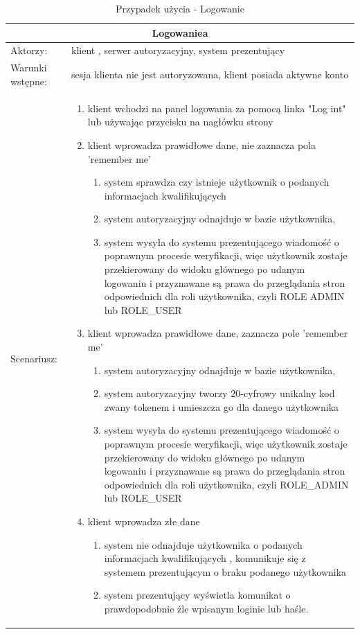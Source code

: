 \begin{table}[h!]
\begin{tabular}{ |p{2cm}||p{13cm}|  }
	
	\hline
	\multicolumn{2}{|c|}{Logowaniea} \\
	\hline
Aktorzy: &klient , serwer autoryzacyjny, system prezentujący\\
	\hline
Warunki wstępne: & sesja klienta nie jest autoryzowana, klient posiada aktywne konto\\
	\hline
	Scenariusz: &
	\begin{enumerate}
		\item klient wchodzi na panel logowania za pomocą linka "Log int" lub używając przycisku na nagłówku strony 
		\item klient wprowadza prawidłowe dane, nie zaznacza pola 'remember me'
		\begin{enumerate}
			\item system sprawdza czy istnieje użytkownik o podanych informacjach kwalifikujących
			\item system autoryzacyjny odnajduje w bazie użytkownika,
			\item system wysyła do systemu prezentującego wiadomość o poprawnym procesie weryfikacji, więc użytkownik zostaje przekierowany do widoku głównego po udanym logowaniu i przyznawane są prawa do przeglądania stron odpowiednich dla roli użytkownika, czyli ROLE ADMIN lub ROLE\_USER
		\end{enumerate}
		\item klient wprowadza prawidłowe dane,  zaznacza pole 'remember me'	
		\begin{enumerate}
			\item system autoryzacyjny odnajduje w bazie użytkownika,
			\item system autoryzacyjny tworzy 20-cyfrowy unikalny kod zwany tokenem i umieszcza go dla danego użytkownika
			\item system wysyła do systemu prezentującego wiadomość o poprawnym procesie weryfikacji, więc użytkownik zostaje przekierowany do widoku głównego po udanym logowaniu i przyznawane są prawa do przeglądania stron odpowiednich dla roli użytkownika, czyli ROLE\_ADMIN lub ROLE\_USER
		\end{enumerate}
		\item klient wprowadza złe dane
		\begin{enumerate}
			\item	system nie odnajduje użytkownika o podanych informacjach kwalifikujących , komunikuje się z systemem prezentującym o braku podanego użytkownika
			\item  system prezentujący wyświetla komunikat o prawdopodobnie źle wpisanym loginie lub haśle.
		\end{enumerate}
	\end{enumerate}
	\\
	\hline

\end{tabular}
	\caption{Przypadek użycia - Logowanie}
\end{table}


